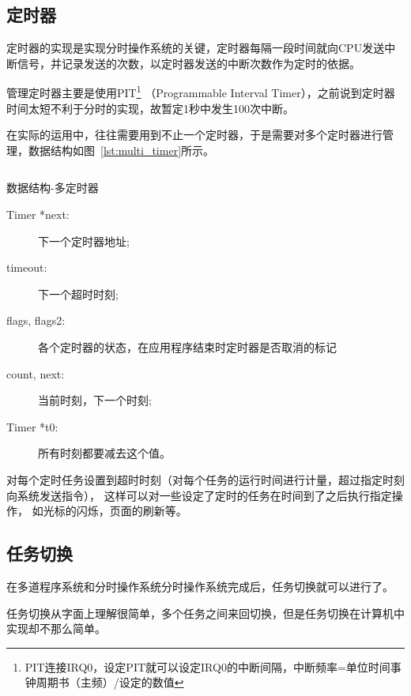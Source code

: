 \subsection{定时器}

定时器的实现是实现分时操作系统的关键，定时器每隔一段时间就向CPU发送中断信号，并记录发送的次数，以定时器发送的中断次数作为定时的依据。

管理定时器主要是使用PIT\footnote{PIT连接IRQ0，设定PIT就可以设定IRQ0的中断间隔，中断频率=单位时间事钟周期书（主频）/设定的数值}
（Programmable Interval Timer），之前说到定时器时间太短不利于分时的实现，故暂定1秒中发生100次中断。

在实际的运用中，往往需要用到不止一个定时器，于是需要对多个定时器进行管理，数据结构如图~\ref{lst:multi_timer}所示。

\begin{listing}[H]
	\inputminted[tabsize=2, firstline=175, lastline=187,
		linenos=true]{c}{../ZOS/src/kernel/bootpack.h}
	\caption{数据结构-多定时器}
	\label{lst:multi_timer}
\end{listing}

\begin{description}
	\item[Timer *next:]下一个定时器地址;
	\item[timeout:]下一个超时时刻;
	\item[flags, flags2:]各个定时器的状态，在应用程序结束时定时器是否取消的标记
	\item[count, next:]当前时刻，下一个时刻;
	\item[Timer *t0:]所有时刻都要减去这个值。
\end{description}

对每个定时任务设置到超时时刻（对每个任务的运行时间进行计量，超过指定时刻向系统发送指令），
这样可以对一些设定了定时的任务在时间到了之后执行指定操作，
如光标的闪烁，页面的刷新等。

\subsection{任务切换}

在多道程序系统和分时操作系统分时操作系统完成后，任务切换就可以进行了。

任务切换从字面上理解很简单，多个任务之间来回切换，但是任务切换在计算机中实现却不那么简单。

